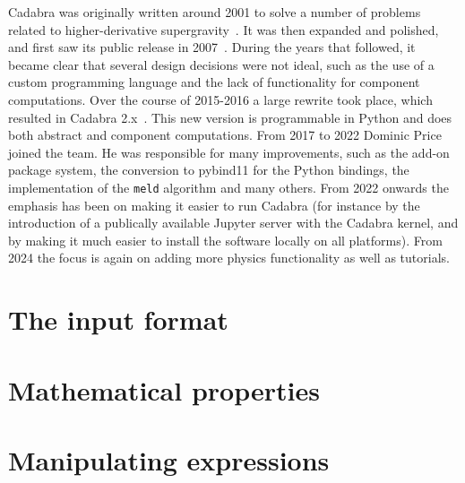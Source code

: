 \documentclass[11pt]{book}
\begin{document}
Cadabra was originally written around 2001 to solve a number of
problems related to higher-derivative
supergravity~\cite{Peeters:2000qj,Peeters:2003pv}. It was then
expanded and polished, and first saw its public release in
2007~\cite{kas_cdb_hep}.  During the years that followed, it became
clear that several design decisions were not ideal, such as the use of
a custom programming language and the lack of functionality for
component computations. Over the course of 2015-2016 a large rewrite
took place, which resulted in Cadabra 2.x~\cite{Peeters:2018dyg}.
This new version is programmable in Python and does both abstract and
component computations. From 2017 to 2022 Dominic Price joined the
team. He was responsible for many improvements, such as the add-on
package system, the conversion to pybind11 for the Python bindings,
the implementation of the {\tt meld} algorithm and many others. From
2022 onwards the emphasis has been on making it easier to run Cadabra
(for instance by the introduction of a publically available Jupyter
server with the Cadabra kernel, and by making it much easier to
install the software locally on all platforms). From 2024 the focus is
again on adding more physics functionality as well as tutorials.


\chapter{The input format}









\chapter{Mathematical properties}




\chapter{Manipulating expressions}








\end{document}
